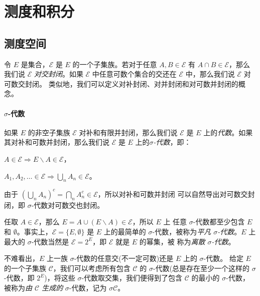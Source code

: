 \documentclass[fontset=none]{Notes}
\begin{document}
\frontmatter

\tableofcontents

\mainmatter

\chapter{测度和积分}

\section{测度空间}

令 $E$ 是集合，$\mathcal{E}$ 是 $E$ 的一个子集族。若对于任意 $A,B\in\mathcal{E}$ 有
$A\cap B\in\mathcal{E}$，那么我们说 $\mathcal{E}$ \emph{对交封闭}。如果 $\mathcal{E}$
中任意可数个集合的交还在 $\mathcal{E}$ 中，那么我们说 $\mathcal{E}$ 对可数交封闭。
类似地，我们可以定义对补封闭、对并封闭和对可数并封闭的概念。

\subsubsection{$\sigma$-代数}

如果 $E$ 的非空子集族 $\mathcal{E}$ 对补和有限并封闭，那么我们说 $\mathcal{E}$
是 $E$ 上的\emph{代数}。如果其对补和可数并封闭，那么我们说 $\mathcal{E}$
是 $E$ 上的\emph{$\sigma$-代数}，即：
\begin{alphenum}
  \item $A\in\mathcal{E}\Rightarrow E\smallsetminus A\in\mathcal{E}$，
  \item $A_1,A_2,\dotsc\in \mathcal{E}\Rightarrow\bigcup_n A_n\in\mathcal{E}$。
\end{alphenum}
由于 $\left(\bigcup_n A_n\right)^c=\bigcap_n A_n^c\in\mathcal{E}$，所以对补和可数并封闭
可以自然导出对可数交封闭，即 $\sigma$-代数对可数交也封闭。

任取 $A\in \mathcal{E}$，那么 $E=A\cup(E \smallsetminus A)\in \mathcal{E}$，所以 $E$ 上
任意 $\sigma$-代数都至少包含 $E$ 和 $\emptyset$。事实上，$\mathcal{E}=\{E,\emptyset\}$
是 $E$ 上的最简单的 $\sigma$-代数，被称为\emph{平凡 $\sigma$-代数}。$E$ 上最大的
$\sigma$-代数当然是 $\mathcal{E}=2^E$，即 $\mathcal{E}$ 就是 $E$ 的幂集，被
称为\emph{离散 $\sigma$-代数}。

不难看出，$E$ 上一族 $\sigma$-代数的任意交(不一定可数)还是 $E$ 上的 $\sigma$-代数。
给定 $E$ 的一个子集族 $\mathcal{C}$，我们可以考虑所有包含 $\mathcal{C}$ 
的 $\sigma$-代数(总是存在至少一个这样的 $\sigma$-代数，即 $2^E$)，将这些
$\sigma$-代数取交集，我们便得到了包含 $\mathcal{C}$ 的最小的 $\sigma$-代数，
被称为\emph{由 $\mathcal{C}$ 生成的} $\sigma$-代数，记为 $\sigma\mathcal{C}$。
\end{document}
